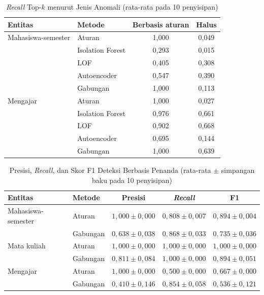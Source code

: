 \documentclass[conference]{IEEEtran}
\begin{document}
\begin{table}[htbp]
\caption{\textit{Recall} Top-$k$ menurut Jenis Anomali (rata-rata pada 10 penyisipan)}
\begin{center}
\begin{tabular}{llcc}
\toprule
\textbf{Entitas} & \textbf{Metode} & \textbf{Berbasis aturan} & \textbf{Halus} \\
\midrule
Mahasiswa-semester & Aturan & 1{,}000 & 0{,}049 \\
 & Isolation Forest & 0{,}293 & 0{,}015 \\
 & LOF & 0{,}405 & 0{,}308 \\
 & Autoencoder & 0{,}547 & 0{,}390 \\
 & Gabungan & 1{,}000 & 0{,}113 \\
\midrule
Mengajar & Aturan & 1{,}000 & 0{,}027 \\
 & Isolation Forest & 0{,}976 & 0{,}661 \\
 & LOF & 0{,}902 & 0{,}668 \\
 & Autoencoder & 0{,}695 & 0{,}144 \\
 & Gabungan & 1{,}000 & 0{,}639 \\
\bottomrule
\end{tabular}
\label{tab:subtle}
\end{center}
\end{table}

\begin{table}[htbp]
\caption{Presisi, \textit{Recall}, dan Skor F1 Deteksi Berbasis Penanda (rata-rata $\pm$ simpangan baku pada 10 penyisipan)}
\begin{center}
\scriptsize\setlength{\tabcolsep}{2pt}
\begin{tabular}{llccc}
\toprule
\textbf{Entitas} & \textbf{Metode} & \textbf{Presisi} & \textbf{\textit{Recall}} & \textbf{F1} \\
\midrule
Mahasiswa-semester & Aturan & $1{,}000{\pm}0{,}000$ & $0{,}808{\pm}0{,}007$ & $0{,}894{\pm}0{,}004$ \\
 & Gabungan & $0{,}638{\pm}0{,}038$ & $0{,}868{\pm}0{,}033$ & $0{,}735{\pm}0{,}036$ \\
\midrule
Mata kuliah & Aturan & $1{,}000{\pm}0{,}000$ & $1{,}000{\pm}0{,}000$ & $1{,}000{\pm}0{,}000$ \\
 & Gabungan & $0{,}811{\pm}0{,}084$ & $1{,}000{\pm}0{,}000$ & $0{,}894{\pm}0{,}051$ \\
\midrule
Mengajar & Aturan & $1{,}000{\pm}0{,}000$ & $0{,}500{\pm}0{,}000$ & $0{,}667{\pm}0{,}000$ \\
 & Gabungan & $0{,}410{\pm}0{,}146$ & $0{,}854{\pm}0{,}058$ & $0{,}536{\pm}0{,}121$ \\
\bottomrule
\end{tabular}
\label{tab:prf}
\end{center}
\end{table}
\end{document}
